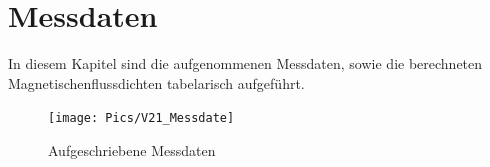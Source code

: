 \section{Messdaten}

In diesem Kapitel sind die aufgenommenen Messdaten, sowie die berechneten
Magnetischenflussdichten tabelarisch aufgeführt.





\newpage

\begin{figure}[h]
  \centering
  \texttt{[image: Pics/V21\_Messdate]}
  \caption{Aufgeschriebene Messdaten}
  \label{fig:aufgeschMessdaten}
\end{figure}
